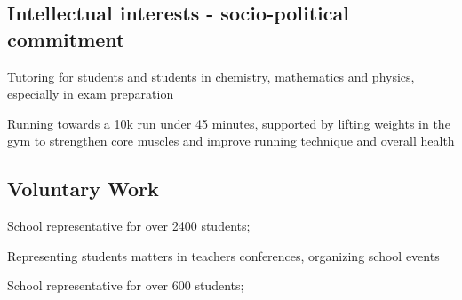\begin{adjustwidth}{2.5cm}{1.9cm}
\subsection{Intellectual interests - socio-political commitment}
\begin{tightemize} \vspace{-3pt}
\item Tutoring for students and students in chemistry, mathematics and physics, especially in exam preparation  
\end{tightemize}
\begin{tightemize} \vspace{-3pt}
\item Running towards a 10k run under 45 minutes, supported by lifting weights in the gym to strengthen core muscles and improve running technique and overall health 
\end{tightemize}
\sectionsep
\subsection{Voluntary Work} 
\vspace{\topsep}
\begin{tightemize} \vspace{-3pt}
\item School representative for over 2400 students;

Representing students matters in teachers conferences, organizing school events
\end{tightemize}
\begin{tightemize} \vspace{-3pt}
\item School representative for over 600 students;  


\end{tightemize}
\end{adjustwidth}
